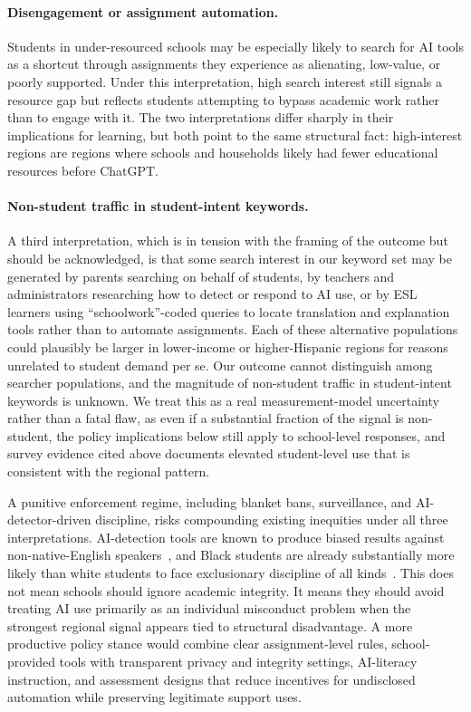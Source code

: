 \documentclass[11pt]{article}
\begin{document}
\paragraph{Disengagement or assignment automation.} Students in under-resourced schools may be especially likely to search for AI tools as a shortcut through assignments they experience as alienating, low-value, or poorly supported. Under this interpretation, high search interest still signals a resource gap but reflects students attempting to bypass academic work rather than to engage with it. The two interpretations differ sharply in their implications for learning, but both point to the same structural fact: high-interest regions are regions where schools and households likely had fewer educational resources before ChatGPT.

\paragraph{Non-student traffic in student-intent keywords.} A third interpretation, which is in tension with the framing of the outcome but should be acknowledged, is that some search interest in our keyword set may be generated by parents searching on behalf of students, by teachers and administrators researching how to detect or respond to AI use, or by ESL learners using ``schoolwork''-coded queries to locate translation and explanation tools rather than to automate assignments. Each of these alternative populations could plausibly be larger in lower-income or higher-Hispanic regions for reasons unrelated to student demand per se. Our outcome cannot distinguish among searcher populations, and the magnitude of non-student traffic in student-intent keywords is unknown. We treat this as a real measurement-model uncertainty rather than a fatal flaw, as even if a substantial fraction of the signal is non-student, the policy implications below still apply to school-level responses, and survey evidence cited above documents elevated student-level use that is consistent with the regional pattern.

A punitive enforcement regime, including blanket bans, surveillance, and AI-detector-driven discipline, risks compounding existing inequities under all three interpretations. AI-detection tools are known to produce biased results against non-native-English speakers~\citep{liang2023, woelfel2023}, and Black students are already substantially more likely than white students to face exclusionary discipline of all kinds~\citep{darlinghammond2024}. This does not mean schools should ignore academic integrity. It means they should avoid treating AI use primarily as an individual misconduct problem when the strongest regional signal appears tied to structural disadvantage. A more productive policy stance would combine clear assignment-level rules, school-provided tools with transparent privacy and integrity settings, AI-literacy instruction, and assessment designs that reduce incentives for undisclosed automation while preserving legitimate support uses.
\end{document}
